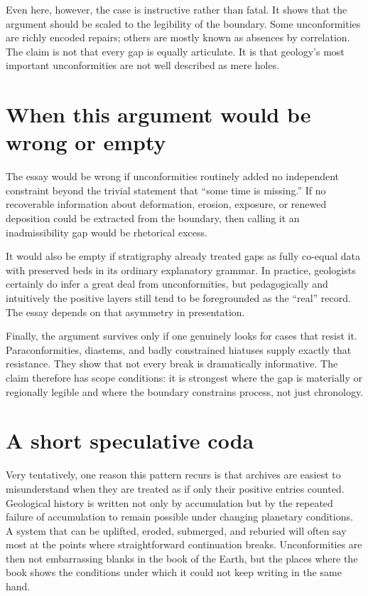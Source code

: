\documentclass[11pt]{article}
\begin{document}
Even here, however, the case is instructive rather than fatal. It shows that the argument should be scaled to the legibility of the boundary. Some unconformities are richly encoded repairs; others are mostly known as absences by correlation. The claim is not that every gap is equally articulate. It is that geology's most important unconformities are not well described as mere holes.

\section{When this argument would be wrong or empty}
The essay would be wrong if unconformities routinely added no independent constraint beyond the trivial statement that ``some time is missing.'' If no recoverable information about deformation, erosion, exposure, or renewed deposition could be extracted from the boundary, then calling it an inadmissibility gap would be rhetorical excess.

It would also be empty if stratigraphy already treated gaps as fully co-equal data with preserved beds in its ordinary explanatory grammar. In practice, geologists certainly do infer a great deal from unconformities, but pedagogically and intuitively the positive layers still tend to be foregrounded as the ``real'' record. The essay depends on that asymmetry in presentation.

Finally, the argument survives only if one genuinely looks for cases that resist it. Paraconformities, diastems, and badly constrained hiatuses supply exactly that resistance. They show that not every break is dramatically informative. The claim therefore has scope conditions: it is strongest where the gap is materially or regionally legible and where the boundary constrains process, not just chronology.

\section{A short speculative coda}
Very tentatively, one reason this pattern recurs is that archives are easiest to misunderstand when they are treated as if only their positive entries counted. Geological history is written not only by accumulation but by the repeated failure of accumulation to remain possible under changing planetary conditions. A system that can be uplifted, eroded, submerged, and reburied will often say most at the points where straightforward continuation breaks. Unconformities are then not embarrassing blanks in the book of the Earth, but the places where the book shows the conditions under which it could not keep writing in the same hand.
\end{document}
